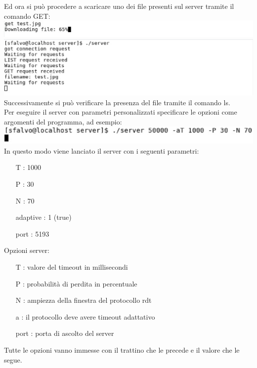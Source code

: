 Ed ora si può procedere a scaricare uno dei file presenti sul server
tramite il comando GET:\\
\includegraphics[scale=0.5]{images/esempio/cli_get}\\
\includegraphics[scale=0.5]{images/esempio/srv_resp}\\
Successivamente si può verificare la presenza del file tramite il comando ls.\\
Per eseguire il server con parametri personalizzati specificare le opzioni
come argomenti del programma, ad esempio:\\
\includegraphics[scale=0.5]{images/esempio/srv_par}\\
In questo modo viene lanciato il server con i seguenti parametri:
\begin{itemize}
\item[T]: 1000
\item[P]: 30
\item[N]: 70
\item[adaptive]: 1 (true)
\item[port]: 5193 
\end{itemize}
Opzioni server:
\begin{itemize}
\item[T]: valore del timeout in millisecondi
\item[P]: probabilità di perdita in percentuale
\item[N]: ampiezza della finestra del protocollo rdt
\item[a]: il protocollo deve avere timeout adattativo
\item[port]: porta di ascolto del server
\end{itemize}
Tutte le opzioni vanno immesse con il trattino che le precede e il valore che le segue.
